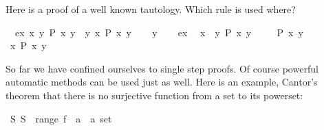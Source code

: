 \begin{isabellebody}
\begin{isamarkuptext}
Here is a proof of a well known tautology.
Which rule is used where?%
\end{isamarkuptext}%
\isamarkuptrue%
\isamarkupfalse%
\ \ ex{}\ {}{}x{}\ {}y{}\ P\ x\ y{}\ \ {}{}y{}\ {}x{}\ P\ x\ y{}\isanewline
%
\isadelimproof
%
\endisadelimproof
%
\isatagproof
{}\isamarkupfalse%
\isanewline
\ \ \isamarkupfalse%
\ y\isanewline
\ \ \isamarkupfalse%
\ ex\ \isamarkupfalse%
\ x\ \ {}{}y{}\ P\ x\ y{}\ \isamarkupfalse%
\isanewline
\ \ \isamarkupfalse%
\ {}P\ x\ y{}\ \isamarkupfalse%
\isanewline
\ \ \isamarkupfalse%
\ {}{}x{}\ P\ x\ y{}\ \isamarkupfalse%
\isanewline
{}\isamarkupfalse%
%
\endisatagproof
{\isafoldproof}%
%
\isadelimproof
%
\endisadelimproof
%
\isamarkuptrue%
%
\begin{isamarkuptext}%
So far we have confined ourselves to single step proofs. Of course
powerful automatic methods can be used just as well. Here is an example,
Cantor's theorem that there is no surjective function from a set to its
powerset:%
\end{isamarkuptext}%
\isamarkuptrue%
\isamarkupfalse%
\ {}{}S{}\ S\ {}\ range\ {}f\ {}{}\ {}a\ {}\ {}a\ set{}{}\isanewline

\end{isabellebody}
